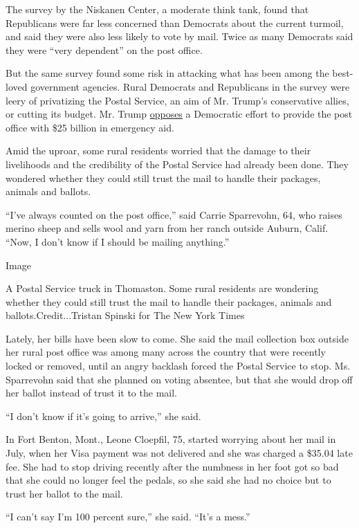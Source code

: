 The survey by the Niskanen Center, a moderate think tank, found that
Republicans were far less concerned than Democrats about the current
turmoil, and said they were also less likely to vote by mail. Twice as
many Democrats said they were ``very dependent'' on the post office.

But the same survey found some risk in attacking what has been among the
best-loved government agencies. Rural Democrats and Republicans in the
survey were leery of privatizing the Postal Service, an aim of Mr.
Trump's conservative allies, or cutting its budget. Mr. Trump
\href{https://www.nytimes3xbfgragh.onion/2020/08/13/us/politics/trump-postal-service-mail-voting.html}{opposes}
a Democratic effort to provide the post office with \$25 billion in
emergency aid.

Amid the uproar, some rural residents worried that the damage to their
livelihoods and the credibility of the Postal Service had already been
done. They wondered whether they could still trust the mail to handle
their packages, animals and ballots.

``I've always counted on the post office,'' said Carrie Sparrevohn, 64,
who raises merino sheep and sells wool and yarn from her ranch outside
Auburn, Calif. ``Now, I don't know if I should be mailing anything.''

Image

A Postal Service truck in Thomaston. Some rural residents are wondering
whether they could still trust the mail to handle their packages,
animals and ballots.Credit...Tristan Spinski for The New York Times

Lately, her bills have been slow to come. She said the mail collection
box outside her rural post office was among many across the country that
were recently locked or removed, until an angry backlash forced the
Postal Service to stop. Ms. Sparrevohn said that she planned on voting
absentee, but that she would drop off her ballot instead of trust it to
the mail.

``I don't know if it's going to arrive,'' she said.

In Fort Benton, Mont., Leone Cloepfil, 75, started worrying about her
mail in July, when her Visa payment was not delivered and she was
charged a \$35.04 late fee. She had to stop driving recently after the
numbness in her foot got so bad that she could no longer feel the
pedals, so she said she had no choice but to trust her ballot to the
mail.

``I can't say I'm 100 percent sure,'' she said. ``It's a mess.''

